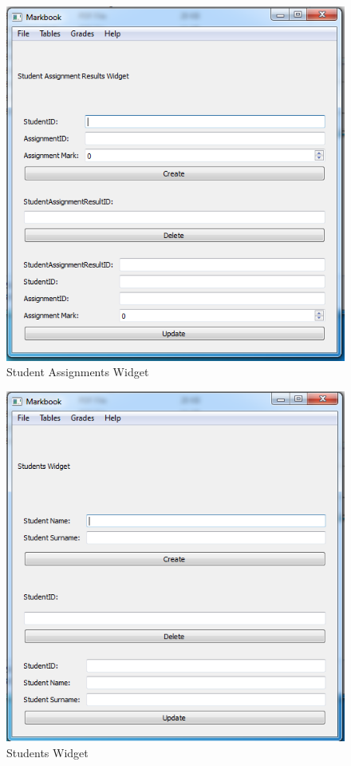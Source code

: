 \begin{figure}[H]
    \includegraphics[width=\textwidth]{./Images/student assignments.png}
    \caption{Student Assignments Widget} \label{}
\end{figure}

\begin{figure}[H]
    \includegraphics[width=\textwidth]{./Images/students.png}
    \caption{Students Widget} \label{}
\end{figure}

